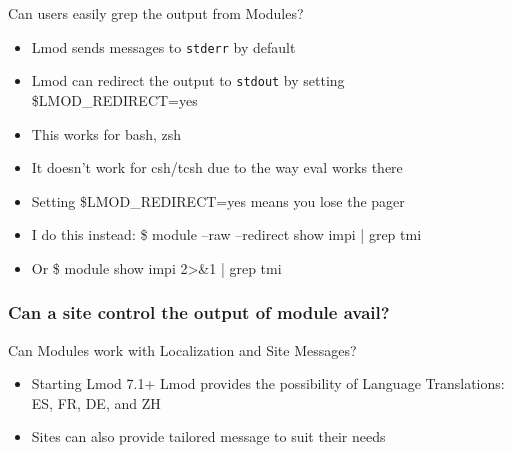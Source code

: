 \documentclass{beamer}
\begin{document}
\begin{frame}{Can users easily grep the output from Modules?}
  \begin{itemize}
    \item Lmod sends messages to \texttt{stderr} by default
    \item Lmod can redirect the output to \texttt{stdout} by setting
      \$LMOD\_REDIRECT=yes
    \item This works for bash, zsh
    \item It doesn't work for csh/tcsh due to the way eval works there
    \item Setting \$LMOD\_REDIRECT=yes means you lose the pager
    \item I do this instead: \$ module --raw --redirect show impi |
      grep tmi
    \item Or \$ module show impi 2>\&1 | grep tmi
  \end{itemize}
\end{frame}

\begin{frame}[fragile]
    \frametitle{Can a site control the output of module avail?}
  {\tiny
}
\end{frame}

\begin{frame}{Can Modules work with Localization and Site Messages?}
  \begin{itemize}
    \item Starting Lmod 7.1+ Lmod provides the possibility of Language
      Translations: ES, FR, DE, and ZH
    \item Sites can also provide tailored message to suit their needs
  \end{itemize}
\end{frame}
\end{document}
